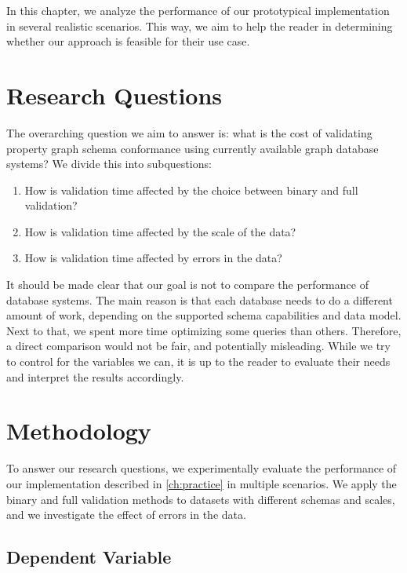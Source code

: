 \documentclass{report}
\theoremstyle{definition}
\begin{document}
In this chapter, we analyze the performance of our prototypical implementation in several realistic scenarios. This way, we aim to help the reader in determining whether our approach is feasible for their use case.

\section{Research Questions}

The overarching question we aim to answer is: what is the cost of validating property graph schema conformance using currently available graph database systems? We divide this into subquestions:

\begin{enumerate}[label=\bfseries RQ\arabic*,ref=RQ\arabic*]
  \item\label{rq:variant} How is validation time affected by the choice between binary and full validation?
  \item\label{rq:scale} How is validation time affected by the scale of the data?
  \item\label{rq:errors} How is validation time affected by errors in the data?
\end{enumerate}

It should be made clear that our goal is not to compare the performance of database systems. The main reason is that each database needs to do a different amount of work, depending on the supported schema capabilities and data model. Next to that, we spent more time optimizing some queries than others. Therefore, a direct comparison would not be fair, and potentially misleading. While we try to control for the variables we can, it is up to the reader to evaluate their needs and interpret the results accordingly.

\section{Methodology}

To answer our research questions, we experimentally evaluate the performance of our implementation described in \autoref{ch:practice} in multiple scenarios. We apply the binary and full validation methods to datasets with different schemas and scales, and we investigate the effect of errors in the data.

\subsection{Dependent Variable}
\end{document}
